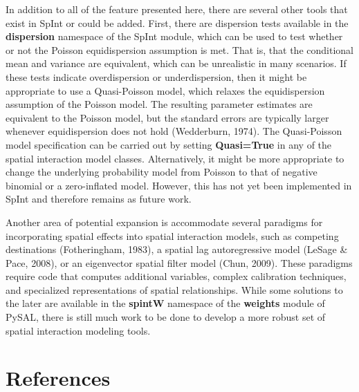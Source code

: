 \documentclass[11pt]{article}
\begin{document}
    In addition to all of the feature presented here, there are several
other tools that exist in SpInt or could be added. First, there are
dispersion tests available in the \textbf{dispersion} namespace of the
SpInt module, which can be used to test whether or not the Poisson
equidispersion assumption is met. That is, that the conditional mean
and variance are equivalent, which can be unrealistic in many scenarios.
If these tests indicate overdispersion or underdispersion, then it might
be appropriate to use a Quasi-Poisson model, which relaxes the
equidispersion assumption of the Poisson model. The resulting parameter
estimates are equivalent to the Poisson model, but the standard errors
are typically larger whenever equidispersion does not hold (Wedderburn,
1974). The Quasi-Poisson model specification can be carried out by
setting \textbf{Quasi=True} in any of the spatial interaction model
classes. Alternatively, it might be more appropriate to change the
underlying probability model from Poisson to that of negative binomial
or a zero-inflated model. However, this has not yet been implemented in
SpInt and therefore remains as future work.

Another area of potential expansion is accommodate several paradigms for
incorporating spatial effects into spatial interaction models, such as
competing destinations (Fotheringham, 1983), a spatial lag
autoregressive model (LeSage \& Pace, 2008), or an eigenvector spatial
filter model (Chun, 2009). These paradigms require code that computes
additional variables, complex calibration techniques, and specialized
representations of spatial relationships. While some solutions to the
later are available in the \textbf{spintW} namespace of the
\textbf{weights} module of PySAL, there is still much work to be done to
develop a more robust set of spatial interaction modeling tools.

    \section*{References}\label{references}
\end{document}
